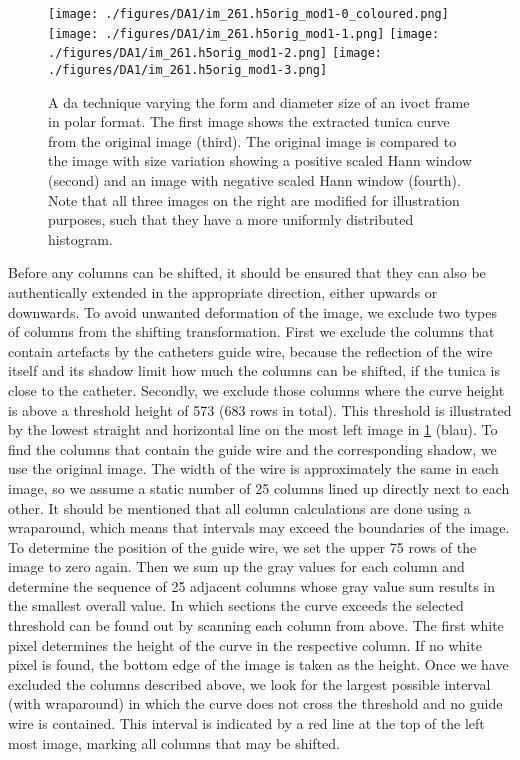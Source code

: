 \begin{figure}[H]
    \centering
    \texttt{[image: ./figures/DA1/im\_261.h5orig\_mod1-0\_coloured.png]}\hfill
    \texttt{[image: ./figures/DA1/im\_261.h5orig\_mod1-1.png]}\hfill
    \texttt{[image: ./figures/DA1/im\_261.h5orig\_mod1-2.png]}\hfill
    \texttt{[image: ./figures/DA1/im\_261.h5orig\_mod1-3.png]}
    \caption[\acrshort{da} technique: polar vessel form variation]{A \acrshort{da} technique varying the form and diameter size of an \acrshort{ivoct} frame in polar format. The first image shows the extracted tunica curve from the original image (third). The original image is compared to the image with size variation showing a positive scaled Hann window (second) and an image with negative scaled Hann window (fourth). Note that all three images on the right are modified for illustration purposes, such that they have a more uniformly distributed histogram.}
    \label{fig:da_sizevariation1}
\end{figure}
Before any columns can be shifted, it should be ensured that they can also be authentically extended in the appropriate direction, either upwards or downwards. To avoid unwanted deformation of the image, we exclude two types of columns from the shifting transformation. First we exclude the columns that contain artefacts by the catheters guide wire, because the reflection of the wire itself and its shadow limit how much the columns can be shifted, if the tunica is close to the catheter. Secondly, we exclude those columns where the curve height is above a threshold height of 573 (683 rows in total). This threshold is illustrated by the lowest straight and horizontal line on the most left image in \cref{fig:da_sizevariation1} (blau). To find the columns that contain the guide wire and the corresponding shadow, we use the original image. The width of the wire is approximately the same in each image, so we assume a static number of 25 columns lined up directly next to each other. It should be mentioned that all column calculations are done using a wraparound, which means that intervals may exceed the boundaries of the image. To determine the position of the guide wire, we set the upper 75 rows of the image to zero again. Then we sum up the gray values for each column and determine the sequence of 25 adjacent columns whose gray value sum results in the smallest overall value. In which sections the curve exceeds the selected threshold can be found out by scanning each column from above. The first white pixel determines the height of the curve in the respective column. If no white pixel is found, the bottom edge of the image is taken as the height. Once we have excluded the columns described above, we look for the largest possible interval (with wraparound) in which the curve does not cross the threshold and no guide wire is contained. This interval is indicated by a red line at the top of the left most image, marking all columns that may be shifted.

